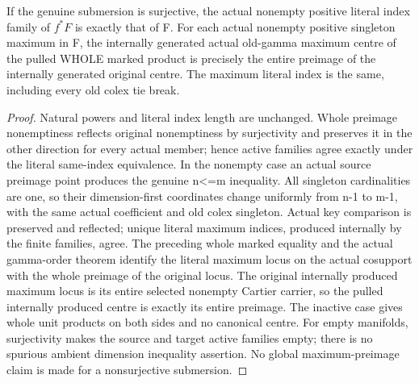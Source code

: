 \begin{theorem}
\label{hir:submersion-nc-actual-active-maximum}
\leanok
If the genuine submersion is surjective, the actual nonempty positive
literal index family of $f^*F$ is exactly that of F. For each actual nonempty
positive singleton maximum in F, the internally generated actual old-gamma
maximum centre of the pulled WHOLE marked product is precisely the entire
preimage of the internally generated original centre. The maximum literal
index is the same, including every old colex tie break.
\end{theorem}
\begin{proof}
Natural powers and literal index length are unchanged. Whole preimage
nonemptiness reflects original nonemptiness by surjectivity and preserves
it in the other direction for every actual member; hence active families
agree exactly under the literal same-index equivalence. In the nonempty
case an actual source preimage point produces the genuine n<=m inequality.
All singleton cardinalities are one, so their dimension-first coordinates
change uniformly from n-1 to m-1, with the same actual coefficient and old
colex singleton. Actual key comparison is preserved and reflected; unique
literal maximum indices, produced internally by the finite families, agree.
The preceding whole marked equality and the actual gamma-order theorem
identify the literal maximum locus on the actual cosupport with the whole
preimage of the original locus. The original internally produced maximum
locus is its entire selected nonempty Cartier carrier, so the pulled
internally produced centre is exactly its entire preimage. The inactive
case gives whole unit products on both sides and no canonical centre.
For empty manifolds, surjectivity makes the source and target active
families empty; there is no spurious ambient dimension inequality assertion.
No global maximum-preimage claim is made for a nonsurjective submersion.
\end{proof}

